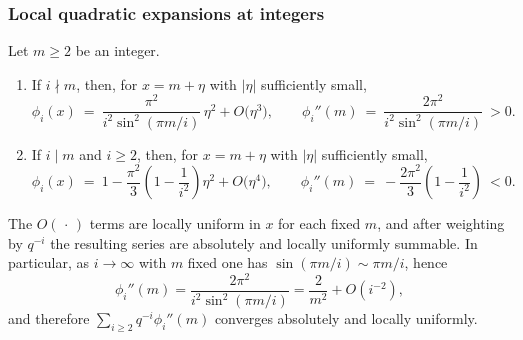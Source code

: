 \subsubsection{Local quadratic expansions at integers}

\begin{lemma}\label{lem:second-derivatives}
Let $m\ge2$ be an integer.
\begin{enumerate}
\item If $i\nmid m$, then, for $x=m+\eta$ with $|\eta|$ sufficiently small,
\[
\phi_i(x)\ =\ \frac{\pi^2}{i^2\sin^2(\pi m/i)}\,\eta^2+O\big(\eta^3\big),
\qquad
\phi_i''(m)\ =\ \frac{2\pi^2}{i^2\sin^2(\pi m/i)}\ >0.
\]
\item If $i\mid m$ and $i\ge2$, then, for $x=m+\eta$ with $|\eta|$ sufficiently small,
\[
\phi_i(x)\ =\ 1-\frac{\pi^2}{3}\!\left(1-\frac1{i^2}\right)\eta^2+O\big(\eta^4\big),
\qquad
\phi_i''(m)\ =\ -\frac{2\pi^2}{3}\!\left(1-\frac1{i^2}\right)\ <0.
\]
\end{enumerate}
The $O(\,\cdot\,)$ terms are locally uniform in $x$ for each fixed $m$, and after weighting by $q^{-i}$ the resulting series are absolutely and locally uniformly summable. In particular, as $i\to\infty$ with $m$ fixed one has $\sin(\pi m/i)\sim \pi m/i$, hence
\[
\phi_i''(m)=\frac{2\pi^2}{i^2\sin^2(\pi m/i)}=\frac{2}{m^2}+O(i^{-2}),
\]
and therefore $\sum_{i\ge2} q^{-i}\phi_i''(m)$ converges absolutely and locally uniformly.
\end{lemma}

